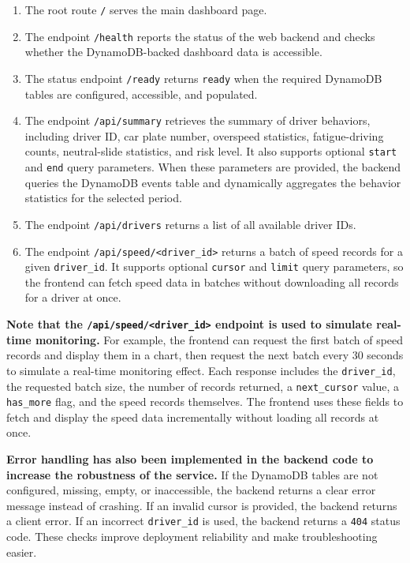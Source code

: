 \documentclass[12pt,a4paper]{article}
\begin{document}
\begin{enumerate}
    \item The root route \texttt{/} serves the main dashboard page.
    \item The endpoint \texttt{/health} reports the status of the web backend and checks whether the DynamoDB-backed dashboard data is accessible.
    \item The status endpoint \texttt{/ready} returns \texttt{ready} when the required DynamoDB tables are configured, accessible, and populated.
    \item The endpoint \texttt{/api/summary} retrieves the summary of driver behaviors, including driver ID, car plate number, overspeed statistics, fatigue-driving counts, neutral-slide statistics, and risk level. It also supports optional \texttt{start} and \texttt{end} query parameters. When these parameters are provided, the backend queries the DynamoDB events table and dynamically aggregates the behavior statistics for the selected period.
    \item The endpoint \texttt{/api/drivers} returns a list of all available driver IDs.
    \item The endpoint \texttt{/api/speed/<driver\_id>} returns a batch of speed records for a given \texttt{driver\_id}. It supports optional \texttt{cursor} and \texttt{limit} query parameters, so the frontend can fetch speed data in batches without downloading all records for a driver at once.
\end{enumerate}

\textbf{Note that the \texttt{/api/speed/<driver\_id>} endpoint is used to simulate real-time monitoring.} For example, the frontend can request the first batch of speed records and display them in a chart, then request the next batch every 30 seconds to simulate a real-time monitoring effect. Each response includes the \texttt{driver\_id}, the requested batch size, the number of records returned, a \texttt{next\_cursor} value, a \texttt{has\_more} flag, and the speed records themselves. The frontend uses these fields to fetch and display the speed data incrementally without loading all records at once.

\textbf{Error handling has also been implemented in the backend code to increase the robustness of the service.} If the DynamoDB tables are not configured, missing, empty, or inaccessible, the backend returns a clear error message instead of crashing. If an invalid cursor is provided, the backend returns a client error. If an incorrect \texttt{driver\_id} is used, the backend returns a \texttt{404} status code. These checks improve deployment reliability and make troubleshooting easier.
\end{document}

